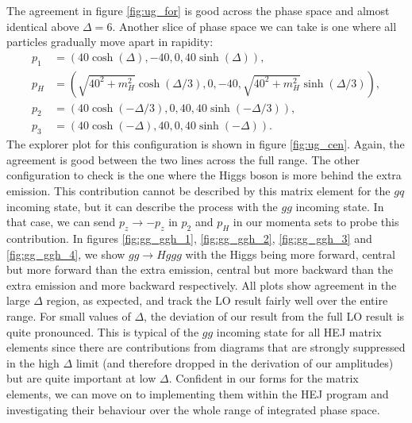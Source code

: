 The agreement in figure \ref{fig:ug_for} is good across the phase space and almost identical above $\Delta = 6$. Another slice of phase space we can take is one where all particles gradually move apart in rapidity:
\begin{subequations}
\begin{align}
p_1 &= (40 \cosh(\Delta),-40,0,40 \sinh(\Delta)), \\
p_H &= (\sqrt{40^2+m_H^2} \cosh(\Delta/3), 0,-40,\sqrt{40^2+m_H^2}  \sinh(\Delta/3)), \\
p_2 &= (40 \cosh(-\Delta/3),0,40,40 \sinh(-\Delta/3)), \\
p_3 &= (40 \cosh(-\Delta),40,0,40 \sinh(-\Delta)).
\end{align}
\end{subequations}
The explorer plot for this configuration is shown in figure \ref{fig:ug_cen}. Again, the agreement is good between the two lines across the full range. The other configuration to check is the one where the Higgs boson is more behind the extra emission. This contribution cannot be described by this matrix element for the $gq$ incoming state, but it can describe the process with the $gg$ incoming state.  In that case, we can send $p_z \to -p_z$ in $p_2$ and $p_H$ in our momenta sets to probe this contribution. In figures \ref{fig:gg_ggh_1}, \ref{fig:gg_ggh_2}, \ref{fig:gg_ggh_3} and \ref{fig:gg_ggh_4}, we show $gg \to Hggg$ with the Higgs being more forward, central but more forward than the extra emission, central but more backward than the extra emission and more backward respectively. All plots show agreement in the large $\Delta$ region, as expected, and track the LO result fairly well over the entire range. For small values of $\Delta$, the deviation of our result from the full LO result is quite pronounced. This is typical of the $gg$ incoming state for all HEJ matrix elements \cite{Andersen2009a} since there are contributions from diagrams that are strongly suppressed in the high $\Delta$ limit (and therefore dropped in the derivation of our amplitudes) but are quite important at low $\Delta$. Confident in our forms for the matrix elements, we can move on to implementing them within the HEJ program and investigating their behaviour over the whole range of integrated phase space.

